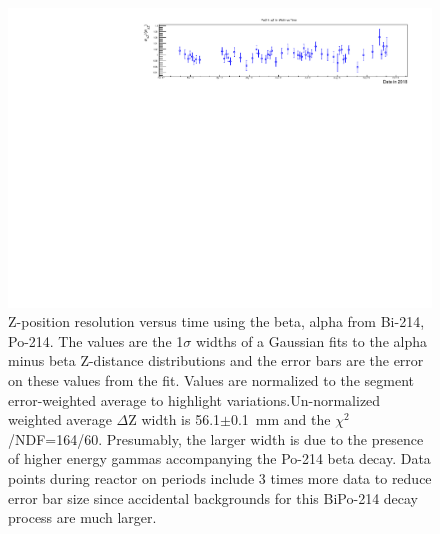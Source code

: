 \begin{figure}[!h]
\centering
\includegraphics[width=1.05\textwidth]{figures/PubBiPo214ZresvsT.pdf}
\caption{\label{fig:ZresvsT214}Z-position resolution versus time using the beta, alpha from Bi-214, Po-214. The values are the 1$\sigma$ widths of a Gaussian fits to the alpha minus beta Z-distance distributions and the error bars are the error on these values from the fit. Values are normalized to the segment error-weighted average to highlight variations.Un-normalized weighted average $\Delta$Z width is 56.1$\pm$0.1~mm and the $\chi^2$/NDF=164/60. Presumably, the larger width is due to the presence of higher energy gammas accompanying the Po-214 beta decay. Data points during reactor on periods include 3 times more data to reduce error bar size since accidental backgrounds for this BiPo-214 decay process are much larger.}
\end{figure}
\newpage

\newpage
